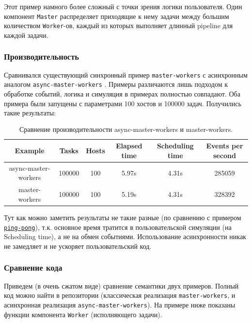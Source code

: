 Этот пример намного более сложный с точки зрения логики пользователя. Один компонент \texttt{Master} распределяет приходящие к нему задачи между большим количеством \texttt{Worker}-ов, каждый из которых выполняет длинный pipeline для каждой задачи. 

\subsubsection{Производительность}

Сравнивался существующий синхронный пример \texttt{master-workers} \cite{master-workers-example} с асинхронным аналогом \texttt{async-master-workers} \cite{async-master-workers-example}. Примеры различаются лишь подходом к обработке событий, логика и симуляция в примерах полностью совпадают. Оба примера были запущены с параметрами 100 хостов и 100000 задач. Получились такие результаты:

\begin{table}[H]
    \centering
    \begin{tabular}{|c|c|c|c|c|c|}
        \hline
        Example & Tasks & Hosts & Elapsed time & Scheduling time & Events per second \\
        \hline
        async-master-workers & 100000 & 100 & 5.97s & 4.31s & 285059 \\
        \hline
        master-workers & 100000 & 100 & 5.19s & 4.31s & 328392 \\
        \hline
    \end{tabular}
    \caption{Сравнение производительности async-master-workers и master-workers.}
    \label{cmp:master-workers}
\end{table}

Тут как можно заметить результаты не такие разные (по сравнению с примером \hyperref[cmp:ping-pong]{\texttt{ping-pong}}), т.к. основное время тратится в пользовательской симуляции (на Scheduling time), а не на обмен событиями. Использование асинхронности никак не замедляет и не ускоряет пользовательский код. 


\subsubsection{Сравнение кода}

Приведем (в очень сжатом виде) сравнение семантики двух примеров. Полный код можно найти в репозитории (классическая реализация \texttt{master-workers}\cite{master-workers-example}, и асинхронная реализация \texttt{async-master-workers}\cite{async-master-workers-example}). На примере ниже показаны функции компонента \texttt{Worker} (исполняющего задачи).

